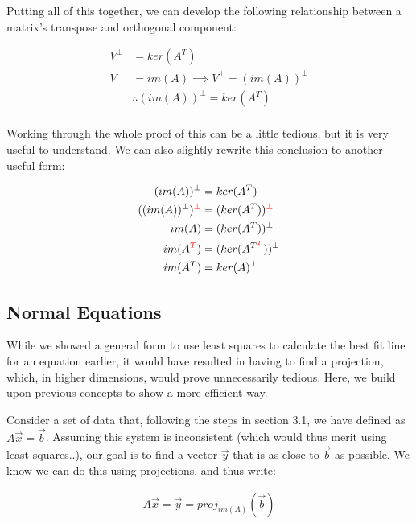 \documentclass[12pt]{article}
\begin{document}
Putting all of this together, we can develop the following relationship between a matrix's transpose and orthogonal component:

\begin{equation}
    \begin{split}
        V^\bot &= ker(A^T)\\
        V &= im(A) \implies V^\bot = (im(A))^\bot\\
        &\therefore (im(A))^\bot = ker(A^T)\\
    \end{split}
\end{equation}

Working through the whole proof of this can be a little tedious, but it is very useful to understand. We can also slightly rewrite this conclusion to another useful form:

\begin{equation}
    \begin{split}
        (im(A))^\bot &= ker(A^T)\\
        ((im(A))^\bot)^{\textcolor{red}{\bot}} &= (ker(A^T))^{\textcolor{red}{\bot}}\\
        im(A) &= (ker(A^T))^\bot\\
        im(A^{\textcolor{red}{T}}) &= (ker(A^{T^{\textcolor{red}{T}}}))^{\bot}\\
        im(A^T) &= ker(A)^\bot
    \end{split}
\end{equation}

\subsection{Normal Equations}

While we showed a general form to use least squares to calculate the best fit line for an equation earlier, it would have resulted in having to find a projection, which, in higher dimensions, would prove unnecessarily tedious. Here, we build upon previous concepts to show a more efficient way.

Consider a set of data that, following the steps in section 3.1, we have defined as $A\vec{x} = \vec{b}$. Assuming this system is inconsistent (which would thus merit using least squares..), our goal is to find a vector $\vec{y}$ that is as close to $\vec{b}$ as possible. We know we can do this using projections, and thus write:

\begin{equation}
    \begin{split}
        A\vec{x} = \vec{y} = proj_{im(A)}(\vec{b})
    \end{split}
\end{equation}
\end{document}

